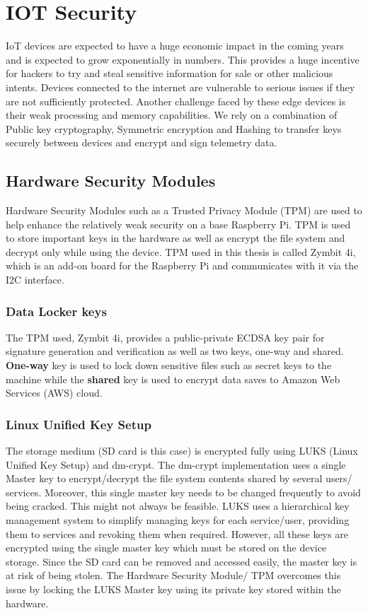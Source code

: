 \documentclass[11pt,openright]{report}
\begin{document}
\section{IOT Security}
IoT devices are expected to have a huge economic impact in the coming years and is expected to grow exponentially in numbers. This provides a huge incentive for hackers to try and steal sensitive information for sale or other malicious intents. Devices connected to the internet are vulnerable to serious issues if they are not sufficiently protected. Another challenge faced by these edge devices is their weak processing and memory capabilities. We rely on a combination of Public key cryptography, Symmetric encryption and Hashing to transfer keys securely between devices and encrypt and sign telemetry data. 

\subsection{Hardware Security Modules}
Hardware Security Modules such as a Trusted Privacy Module (TPM) are used to help enhance the relatively weak security on a base Raspberry Pi. TPM is used to store important keys in the hardware as well as encrypt the file system and decrypt only while using the device. TPM used in this thesis is called Zymbit 4i, which is an add-on board for the Raspberry Pi and communicates with it via the I2C interface.

\subsubsection{Data Locker keys}
The TPM used, Zymbit 4i, provides a public-private ECDSA key pair for signature generation and verification as well as two keys, one-way and shared. \textbf{One-way} key is used to lock down sensitive files such as secret keys to the machine while the \textbf{shared} key is used to encrypt data saves to Amazon Web Services (AWS) cloud. 

\subsubsection{Linux Unified Key Setup}
The storage medium (SD card is this case) is encrypted fully using LUKS (Linux Unified Key Setup) and dm-crypt. The dm-crypt implementation uses a single Master key to encrypt/decrypt the file system contents shared by several users/ services. Moreover, this single master key needs to be changed frequently to avoid being cracked. This might not always be feasible. LUKS uses a hierarchical key management system to simplify managing keys for each service/user, providing them to services and revoking them when required. However, all these keys are encrypted using the single master key which must be stored on the device storage. Since the SD card can be removed and accessed easily, the master key is at risk of being stolen. The Hardware Security Module/ TPM overcomes this issue by locking the LUKS Master key using its private key stored within the hardware.
\end{document}
